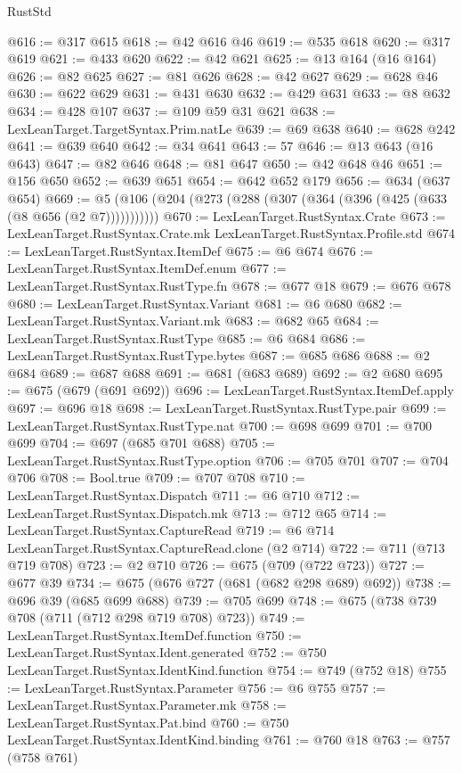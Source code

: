 \begin{lexlean}{RustStd}
\begin{coremodule}
{\begin{coremodule}
{{{{{{{{{{{{{{@616 := @317 @615
@618 := @42 @616 @46
@619 := @535 @618
@620 := @317 @619
@621 := @433 @620
@622 := @42 @621
@625 := @13 @164 (@16 @164)
@626 := @82 @625
@627 := @81 @626
@628 := @42 @627
@629 := @628 @46
@630 := @622 @629
@631 := @431 @630
@632 := @429 @631
@633 := @8 @632
@634 := @428 @107
@637 := @109 @59 @31 @621
@638 := LexLeanTarget.TargetSyntax.Prim.natLe
@639 := @69 @638
@640 := @628 @242
@641 := @639 @640
@642 := @34 @641
@643 := 57
@646 := @13 @643 (@16 @643)
@647 := @82 @646
@648 := @81 @647
@650 := @42 @648 @46
@651 := @156 @650
@652 := @639 @651
@654 := @642 @652 @179
@656 := @634 (@637 @654)
@669 := @5 (@106 (@204 (@273 (@288 (@307 (@364 (@396 (@425 (@633 (@8 @656 (@2 @7)))))))))))
@670 := LexLeanTarget.RustSyntax.Crate
@673 := LexLeanTarget.RustSyntax.Crate.mk LexLeanTarget.RustSyntax.Profile.std
@674 := LexLeanTarget.RustSyntax.ItemDef
@675 := @6 @674
@676 := LexLeanTarget.RustSyntax.ItemDef.enum
@677 := LexLeanTarget.RustSyntax.RustType.fn
@678 := @677 @18
@679 := @676 @678
@680 := LexLeanTarget.RustSyntax.Variant
@681 := @6 @680
@682 := LexLeanTarget.RustSyntax.Variant.mk
@683 := @682 @65
@684 := LexLeanTarget.RustSyntax.RustType
@685 := @6 @684
@686 := LexLeanTarget.RustSyntax.RustType.bytes
@687 := @685 @686
@688 := @2 @684
@689 := @687 @688
@691 := @681 (@683 @689)
@692 := @2 @680
@695 := @675 (@679 (@691 @692))
@696 := LexLeanTarget.RustSyntax.ItemDef.apply
@697 := @696 @18
@698 := LexLeanTarget.RustSyntax.RustType.pair
@699 := LexLeanTarget.RustSyntax.RustType.nat
@700 := @698 @699
@701 := @700 @699
@704 := @697 (@685 @701 @688)
@705 := LexLeanTarget.RustSyntax.RustType.option
@706 := @705 @701
@707 := @704 @706
@708 := Bool.true
@709 := @707 @708
@710 := LexLeanTarget.RustSyntax.Dispatch
@711 := @6 @710
@712 := LexLeanTarget.RustSyntax.Dispatch.mk
@713 := @712 @65
@714 := LexLeanTarget.RustSyntax.CaptureRead
@719 := @6 @714 LexLeanTarget.RustSyntax.CaptureRead.clone (@2 @714)
@722 := @711 (@713 @719 @708)
@723 := @2 @710
@726 := @675 (@709 (@722 @723))
@727 := @677 @39
@734 := @675 (@676 @727 (@681 (@682 @298 @689) @692))
@738 := @696 @39 (@685 @699 @688)
@739 := @705 @699
@748 := @675 (@738 @739 @708 (@711 (@712 @298 @719 @708) @723))
@749 := LexLeanTarget.RustSyntax.ItemDef.function
@750 := LexLeanTarget.RustSyntax.Ident.generated
@752 := @750 LexLeanTarget.RustSyntax.IdentKind.function
@754 := @749 (@752 @18)
@755 := LexLeanTarget.RustSyntax.Parameter
@756 := @6 @755
@757 := LexLeanTarget.RustSyntax.Parameter.mk
@758 := LexLeanTarget.RustSyntax.Pat.bind
@760 := @750 LexLeanTarget.RustSyntax.IdentKind.binding
@761 := @760 @18
@763 := @757 (@758 @761)
}}}}}}}}}}}}}}
\end{coremodule}}
\end{coremodule}
\end{lexlean}
